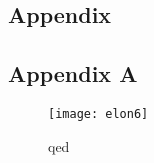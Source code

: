\begin{appendices}
\chapter{Appendix}
\section{Appendix A}
\begin{figure}
  \texttt{[image: elon6]}
  \caption{qed}
  \label{qed}
\end{figure}
\end{appendices}
